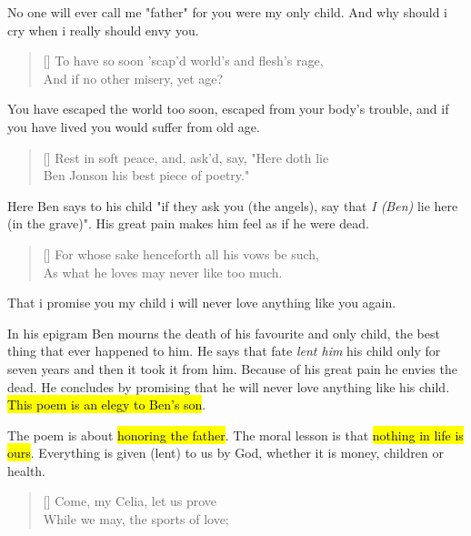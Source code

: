 No one will ever call me "father" for you were my only child.
And why should i cry when i really should envy you.

\begin{verse}[\versewidth]
{\fontverse
To have so soon 'scap'd world's and flesh's rage, \\
And if no other misery, yet age?
}
\end{verse}

You have escaped the world too soon, escaped from your
body's trouble, and if you have lived you would suffer from old age.\bigbreak

\begin{verse}[\versewidth]
{\fontverse
Rest in soft peace, and, ask'd, say, "Here doth lie \\
Ben Jonson his best piece of poetry." 
}
\end{verse}

Here Ben says to his child "if they ask you (the angels), say that 
\textit{I (Ben)} lie here (in the grave)". His great pain makes him
feel as if he were dead.

\begin{verse}[\versewidth]
{\fontverse
For whose sake henceforth all his vows be such, \\
As what he loves may never like too much. 
}
\end{verse}


That i promise you my child i will never love anything like you 
again.\medbreak



In his epigram Ben mourns the death of his favourite and only child, the best thing
that ever happened to him. He says that fate \textit{lent him} his child
only for seven years and then it took it from him. Because of his great
pain he envies the dead. He concludes by promising that he will never love
anything like his child. \hl{This poem is an elegy to Ben's
son}.


The poem is about \hl{honoring the father}. The moral lesson
is that \hl{nothing in life is ours}. Everything is given 
(lent) to us by God, whether it is money, children or health.

\settowidth{\versewidth}{Come, my Celia, let us prove}
\begin{verse}[\versewidth]
{\fontverse
Come, my Celia, let us prove\\
While we may, the sports of love;
}
\end{verse}

